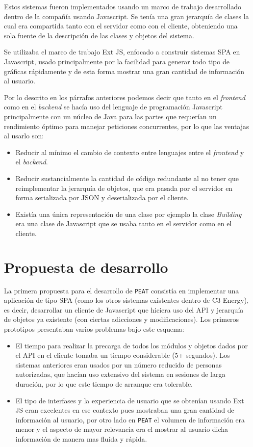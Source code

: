 Estos sistemas fueron implementados usando un marco de trabajo desarrollado dentro
de la compañía usando Javascript. Se tenía una gran jerarquía de clases
la cual era compartida tanto con el servidor como con el cliente, obteniendo una
sola fuente de la descripción de las clases y objetos del sistema.

Se utilizaba el marco de trabajo Ext JS, enfocado a construir sistemas SPA
en Javascript, usado principalmente por la facilidad para generar
todo tipo de gráficas rápidamente y de esta forma mostrar una gran cantidad
de información al usuario.

Por lo descrito en los párrafos anteriores podemos decir que tanto en el
\textit{frontend} como en el \textit{backend} se hacía uso del lenguaje
de programación Javascript principalmente con un núcleo de Java para las partes
que requerían un rendimiento óptimo para manejar peticiones concurrentes,
por lo que las ventajas al usarlo son:

\begin{itemize}
\item Reducir al mínimo el cambio de contexto entre lenguajes entre
  el \textit{frontend} y el \textit{backend}.
\item Reducir sustancialmente la cantidad de código redundante al no
  tener que reimplementar la jerarquía de objetos, que era pasada
  por el servidor en forma serializada por JSON y deserializada por el
  cliente.
\item Existía una única representación de una clase por ejemplo la
  clase \textit{Building} era una clase de Javascript que se usaba
  tanto en el servidor como en el cliente.
\end{itemize}

\section{Propuesta de desarrollo}
La primera propuesta para el desarrollo de \texttt{PEAT} consistía
en implementar una aplicación de tipo SPA (como los otros sistemas
existentes dentro de C3 Energy), es decir, desarrollar un cliente
de Javascript que hiciera uso del API y jerarquía de objetos
ya existente (con ciertas adicciones y modificaciones).
Los primeros prototipos presentaban varios problemas bajo este esquema:

\begin{itemize}
\item El tiempo para realizar la precarga de todos los módulos y
  objetos dados por el API en el cliente tomaba un tiempo
  considerable (5+ segundos). Los sistemas anteriores eran usados
  por un número reducido de personas autorizadas, que hacían uso
  extensivo del sistema en sesiones de larga duración, por lo
  que este tiempo de arranque era tolerable.
\item El tipo de interfases y la experiencia de usuario que se obtenían
  usando Ext JS eran excelentes en ese contexto pues mostraban una gran
  cantidad de información al usuario, por otro lado en \texttt{PEAT}
  el volumen de información era menor y el aspecto de mayor relevancia
  era el mostrar al usuario dicha información de manera mas fluída y rápida.
\end{itemize}

